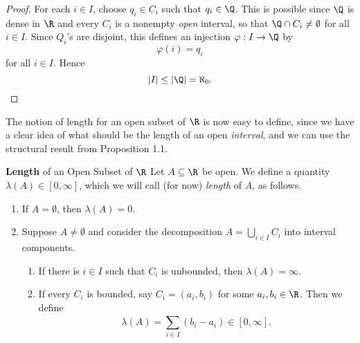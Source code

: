 \documentclass[pmath450]{subfiles}
\begin{document}
    \begin{proof}
        For each $i\in I$, choose $q_i\in C_i$ such that $q_i\in\Q$. This is possible since $\Q$ is dense in $\R$ and every $C_i$ is a nonempty \textit{open} interval, so that $\Q\cap C_i\neq\emptyset$ for all $i\in I$. Since $Q_i$'s are disjoint, this defines an injection $\varphi:I\to\Q$ by
        \begin{equation*}
            \varphi\left( i \right) = q_i
        \end{equation*}
        for all $i\in I$. Hence
        \begin{equation*}
            \left| I \right| \leq \left| \Q \right| = \aleph_0.
        \end{equation*}
    \end{proof}

    \np The notion of length for an open subset of $\R$ is now easy to define, since we have a clear idea of what should be the length of an open \textit{interval}, and we can use the structural result from Proposition 1.1.

    \begin{definition}{\textbf{Length} of an Open Subset of $\R$}
        Let $A\subseteq\R$ be open. We define a quantity $\lambda\left( A \right)\in\left[ 0,\infty \right]$, which we will call (for now) \emph{length} of $A$, as follows.
        \begin{enumerate}
            \item If $A=\emptyset$, then $\lambda\left( A \right)=0$.
            \item Suppose $A\neq\emptyset$ and consider the decomposition $A=\bigcup^{}_{i\in I}C_i$ into interval components.
                \begin{enumerate}
                    \item If there is $i\in I$ such that $C_i$ is unbounded, then $\lambda\left( A \right)=\infty$.
                    \item If every $C_i$ is bounded, say $C_i=\left( a_i,b_i \right)$ for some $a_i,b_i\in\R$. Then we define
                        \begin{equation}
                            \lambda\left( A \right) = \sum^{}_{i\in I}\left( b_i-a_i \right)\in\left[ 0,\infty \right].
                        \end{equation}
                \end{enumerate}
        \end{enumerate}
    \end{definition}
\end{document}
